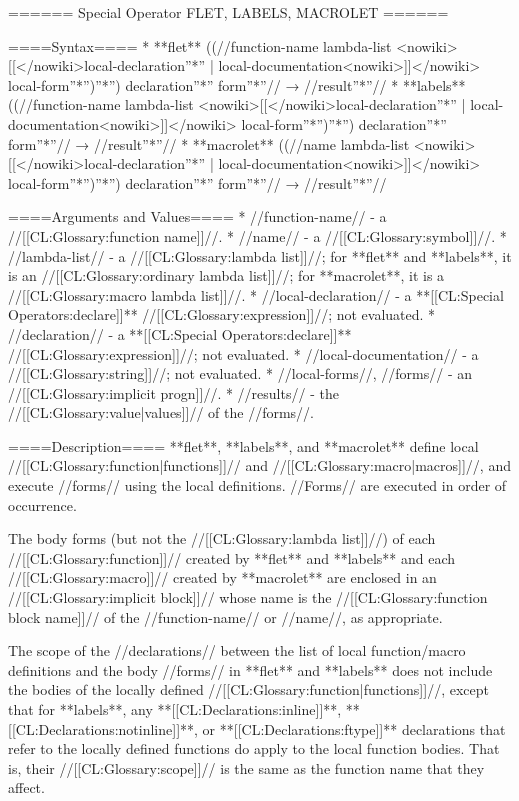 ====== Special Operator FLET, LABELS, MACROLET ======

====Syntax====
  * **flet** ((//function-name lambda-list <nowiki>[[</nowiki>local-declaration''*'' | local-documentation<nowiki>]]</nowiki> local-form''*'')''*'') declaration''*'' form''*''// → //result''*''//
  * **labels** ((//function-name lambda-list <nowiki>[[</nowiki>local-declaration''*'' | local-documentation<nowiki>]]</nowiki> local-form''*'')''*'') declaration''*'' form''*''// → //result''*''//
  * **macrolet** ((//name lambda-list <nowiki>[[</nowiki>local-declaration''*'' | local-documentation<nowiki>]]</nowiki> local-form''*'')''*'') declaration''*'' form''*''// → //result''*''//

====Arguments and Values====
  * //function-name// - a //[[CL:Glossary:function name]]//.
  * //name// - a //[[CL:Glossary:symbol]]//.
  * //lambda-list// - a //[[CL:Glossary:lambda list]]//; for **flet** and **labels**, it is an //[[CL:Glossary:ordinary lambda list]]//; for **macrolet**, it is a //[[CL:Glossary:macro lambda list]]//.
  * //local-declaration// - a **[[CL:Special Operators:declare]]** //[[CL:Glossary:expression]]//; not evaluated.
  * //declaration// - a **[[CL:Special Operators:declare]]** //[[CL:Glossary:expression]]//; not evaluated.
  * //local-documentation// - a //[[CL:Glossary:string]]//; not evaluated.
  * //local-forms//, //forms// - an //[[CL:Glossary:implicit progn]]//.
  * //results// - the //[[CL:Glossary:value|values]]// of the //forms//.

====Description====
**flet**, **labels**, and **macrolet** define local //[[CL:Glossary:function|functions]]// and //[[CL:Glossary:macro|macros]]//, and execute //forms// using the local definitions. //Forms// are executed in order of occurrence.

The body forms (but not the //[[CL:Glossary:lambda list]]//) of each //[[CL:Glossary:function]]// created by **flet** and **labels** and each //[[CL:Glossary:macro]]// created by **macrolet** are enclosed in an //[[CL:Glossary:implicit block]]// whose name is the //[[CL:Glossary:function block name]]// of the //function-name// or //name//, as appropriate.

The scope of the //declarations// between the list of local function/macro definitions and the body //forms// in **flet** and **labels** does not include the bodies of the locally defined //[[CL:Glossary:function|functions]]//, except that for **labels**, any **[[CL:Declarations:inline]]**, **[[CL:Declarations:notinline]]**, or **[[CL:Declarations:ftype]]** declarations that refer to the locally defined functions do apply to the local function bodies. That is, their //[[CL:Glossary:scope]]// is the same as the function name that they affect.

